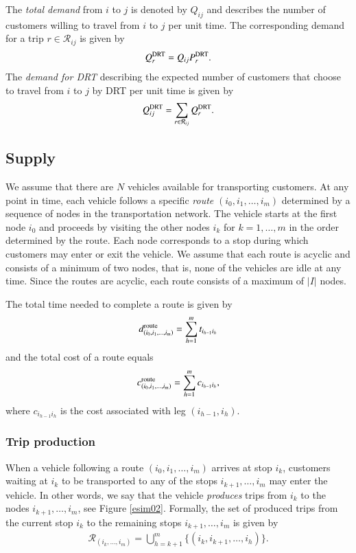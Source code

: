 \documentclass[dissertation,draft*]{aaltoseries}
\begin{document}
The \emph{total demand} from $i$ to $j$ is denoted by $Q_{ij}$ and describes
the number of customers willing to travel from $i$ to $j$ per unit time.
The corresponding demand for a trip $r \in \mathcal{R}_{ij}$ is given by
\begin{align}
\label{matkakysynta}
Q_{r}^{\rm DRT} = Q_{ij} P_{r}^{\rm DRT}.
\end{align}
The \emph{demand for DRT} describing the expected number of customers that 
choose to travel from $i$ to $j$ by DRT per unit time is given by
\begin{align}
\label{drtkysynta}
Q_{ij}^{\rm DRT} = \sum_{r\in \mathcal{R}_{ij}} Q_{r}^{\rm DRT}.
\end{align}

\subsection{Supply}
\label{vehiclemovements}
We assume that there are $N$ vehicles available for transporting customers. 
At any point in time, each vehicle follows a specific \emph{route} $(i_0,i_1,\ldots,i_m)$ 
determined by a sequence of nodes in the transportation network.
The vehicle starts at the first node $i_0$ and proceeds by visiting the other nodes $i_k$
for $k=1,\ldots,m$ in the order determined by the route.
Each node corresponds to a stop during which customers may enter or exit the vehicle.
We assume that each route is acyclic and consists of a minimum of two nodes, that is, none of the
vehicles are idle at any time. Since the routes are acyclic, each route consists of
a maximum of $|I|$ nodes.

The total time needed to complete a route is given by 
\begin{align}
\label{totaltime}
d_{(i_0,i_1,\ldots,i_m)}^{\rm route} = \sum_{h=1}^m t_{i_{h-1} i_h}
\end{align}
and the total cost of a route equals 
\begin{align}
\label{totalcost}
c_{(i_0,i_1,\ldots,i_m)}^{\rm route} = \sum_{h=1}^m c_{i_{h-1} i_h},
\end{align}
where $c_{i_{h-1}i_h}$ is the cost associated with leg $(i_{h-1},i_h)$.


\subsubsection{Trip production}
When a vehicle following a route $(i_0,i_1,\ldots,i_m)$ arrives at stop $i_k$, customers waiting at $i_k$ to
be transported to any of the stops $i_{k+1},\ldots,i_m$ may enter the vehicle.
In other words, we say that the vehicle \emph{produces} trips from $i_k$ to the nodes $i_{k+1},\ldots,i_m$, see Figure \ref{esim02}.
Formally, the set of produced trips from the current stop $i_k$ to the remaining stops $i_{k+1},\ldots,i_m$ is given by
\begin{align}
\label{tripproduction}
\mathcal{R}_{(i_k,\ldots, i_m)} = \bigcup_{h =k+1}^m \{(i_k,i_{k+1},\ldots,i_h)\}.  
\end{align}
\end{document}
